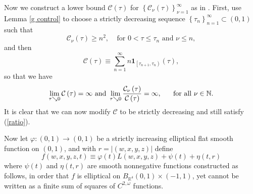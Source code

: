 \documentclass{amsart}
\theoremstyle{plain}
\numberwithin{equation}{section}
\begin{document}
Now we construct a lower bound $\mathcal{C}\left( \tau \right) $ for $%
\left\{ \mathcal{C}_{\nu }\left( \tau \right) \right\} _{\nu =1}^{\infty }$
as in \cite{BoBrCoPe}. First, use Lemma \ref{g control} to choose a strictly
decreasing sequence $\left\{ \tau _{n}\right\} _{n=1}^{\infty }\subset
\left( 0,1\right) $ such that%
\begin{equation*}
\mathcal{C}_{\nu }\left( \tau \right) \geq n^{2},\ \ \ \ \ \text{for }0<\tau
\leq \tau _{n}\text{ and }\nu \leq n,
\end{equation*}%
and then%
\begin{equation*}
\mathcal{C}\left( \tau \right) \equiv \sum_{n=1}^{\infty }n\mathbf{1}_{\left[
\tau _{n+1},\tau _{n}\right) }\left( \tau \right) ,
\end{equation*}%
so that we have%
\begin{equation}
\lim_{\tau \searrow 0}\mathcal{C}\left( \tau \right) =\infty \text{ and }%
\lim_{\tau \searrow 0}\frac{\mathcal{C}_{\nu }\left( \tau \right) }{\mathcal{%
C}\left( \tau \right) }=\infty ,\ \ \ \ \ \text{for all }\nu \in \mathbb{N}.
\label{ratio}
\end{equation}%
It is clear that we can now modify $\mathcal{C}$ to be strictly decreasing
and still satisfy (\ref{ratio}).

Now let $\varphi :\left( 0,1\right) \rightarrow \left( 0,1\right) $ be a
strictly increasing elliptical flat smooth function on $\left( 0,1\right) $,
and with $r=\left\vert \left( w,x,y,z\right) \right\vert $ define%
\begin{equation}
f\left( w,x,y,z,t\right) \equiv \varphi \left( t\right) L\left(
w,x,y,z\right) +\psi \left( t\right) +\eta \left( t,r\right)  \label{def f}
\end{equation}%
where $\psi \left( t\right) $ and $\eta \left( t,r\right) $ are smooth
nonnegative functions constructed as follows, in order that $f$ is
elliptical on $B_{\mathbb{R}^{4}}\left( 0,1\right) \times \left( -1,1\right) 
$, yet cannot be written as a finite sum of squares of $C^{2,\omega }$
functions.
\end{document}
